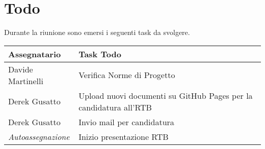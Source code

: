 \section{Todo}
Durante la riunione sono emersi i seguenti task da svolgere.

\begin{center}
  \begin{tabular}{|p{5cm}|p{8cm}|}
    \hline
    \textbf{Assegnatario}       & \textbf{Task Todo} \\ \hline
    Davide Martinelli & Verifica Norme di Progetto \\ \hline
    Derek Gusatto & Upload nuovi documenti su GitHub Pages per la candidatura all'RTB\\ \hline
    Derek Gusatto & Invio mail per candidatura\\ \hline
    \textit{Autoassegnazione} & Inizio presentazione RTB \\ \hline
  \end{tabular}
\end{center}